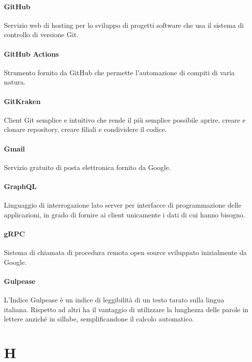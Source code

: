 \documentclass[]{article}
\begin{document}
	\paragraph*{GitHub}
	Servizio web di hosting per lo sviluppo di progetti software che usa il sistema di controllo di versione Git.
	
	\paragraph*{GitHub Actions}
	Strumento fornito da GitHub che permette l’automazione di compiti di varia natura.
	
	\paragraph*{GitKraken}
	Client Git semplice e intuitivo che rende il più semplice possibile aprire, creare e clonare repository, creare filiali e condividere il codice.
	
	\paragraph*{Gmail}
	Servizio gratuito di posta elettronica fornito da Google.
	
	\paragraph*{GraphQL}
	Linguaggio di interrogazione lato server per interfacce di programmazione delle applicazioni, in grado di fornire ai client unicamente i dati di cui hanno bisogno.
	
	\paragraph*{gRPC}
	Sistema di chiamata di procedura remota open source sviluppato inizialmente da Google.
	
	\paragraph*{Gulpease}
	L'Indice Gulpease è un indice di leggibilità di un testo tarato sulla lingua italiana. Rispetto ad altri ha il vantaggio di utilizzare la lunghezza delle parole in lettere anziché in sillabe, semplificandone il calcolo automatico.
	
	\newpage
	
	\section*{H}
	
\end{document}
